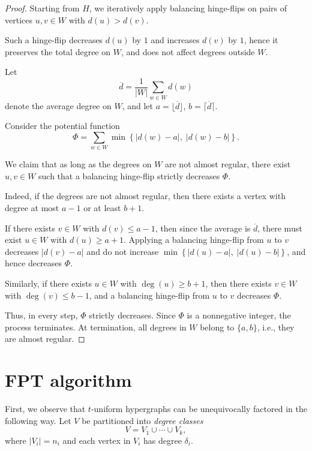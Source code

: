 \documentclass[pdflatex,sn-mathphys-num]{sn-jnl}%
\theoremstyle{thmstyleone}%
\theoremstyle{thmstyletwo}%
\theoremstyle{thmstylethree}%
\begin{document}
\begin{proof}
Starting from $H$, we iteratively apply balancing hinge-flips on pairs of vertices $u,v \in W$ with $d(u) > d(v)$.

Such a hinge-flip decreases $d(u)$ by $1$ and increases $d(v)$ by $1$, hence it preserves the total degree on $W$, and does not affect degrees outside $W$.

Let
\[
\overline{d} = \frac{1}{|W|} \sum_{w \in W} d(w)
\]
denote the average degree on $W$, and let $a = \lfloor \overline{d} \rfloor$, $b = \lceil \overline{d} \rceil$.

Consider the potential function
\[
\Phi = \sum_{w \in W} \min\left\{ |d(w) - a|,\; |d(w) - b| \right\}.
\]

We claim that as long as the degrees on $W$ are not almost regular, there exist $u,v \in W$ such that a balancing hinge-flip strictly decreases $\Phi$.

Indeed, if the degrees are not almost regular, then there exists a vertex with degree at most $a-1$ or at least $b+1$.

If there exists $v \in W$ with $d(v) \le a-1$, then since the average is $\overline{d}$, there must exist $u \in W$ with $d(u) \ge a+1$. Applying a balancing hinge-flip from $u$ to $v$ decreases $|d(v)-a|$ and do not increase $ \min\left\{ |d(u) - a|,\; |d(u) - b| \right\}$, and hence decreases $\Phi$.

Similarly, if there exists $u \in W$ with $\deg(u) \ge b+1$, then there exists $v \in W$ with $\deg(v) \le b-1$, and a balancing hinge-flip from $u$ to $v$ decreases $\Phi$.

Thus, in every step, $\Phi$ strictly decreases. Since $\Phi$ is a nonnegative integer, the process terminates. At termination, all degrees in $W$ belong to $\{a,b\}$, i.e., they are almost regular.
\end{proof}

\section{FPT algorithm}
First, we observe that $t$-uniform hypergraphs can be unequivocally factored in the following way.
Let $V$ be partitioned into \emph{degree classes}
\[
V = V_1 \cup \cdots \cup V_k,
\]
where $|V_i| = n_i$ and each vertex in $V_i$ has degree $\delta_i$.
\end{document}
